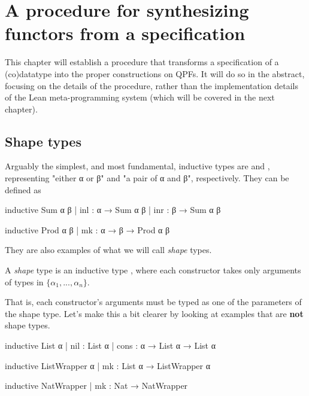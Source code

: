 
\chapter{A procedure for synthesizing functors from a specification}
\label{ch:procedure}

This chapter will establish a procedure that transforms a specification of a (co)datatype
into the proper constructions on QPFs.
It will do so in the abstract, focusing on the details of the procedure, rather than the implementation
details of the Lean meta-programming system (which will be covered in the next chapter).


\section{Shape types}
\label{sec:shape_types}

Arguably the simplest, and most fundamental, inductive types are  and ,
representing "either α or β" and "a pair of α and β", respectively.
They can be defined as

\begin{center}
\begin{minipage}[t]{0.45\linewidth}
    \begin{leancode}
inductive Sum α β
  | inl : α → Sum α β
  | inr : β → Sum α β
    \end{leancode}
\end{minipage}
\begin{minipage}[t]{0.45\linewidth}
    \begin{leancode}    
inductive Prod α β
  | mk : α → β → Prod α β
    \end{leancode}
\end{minipage}
\end{center}

They are also examples of what we will call \emph{shape} types.
\begin{definition}
    A \emph{shape} type is an inductive type , 
    where each constructor takes only arguments of types in $\{α_1, ..., α_n\}$.
\end{definition}
That is, each constructor's arguments must be typed as one of the parameters of the shape type.
Let's make this a bit clearer by looking at examples that are \textbf{not} shape types. 

\begin{leancode}
  inductive List α
    | nil  : List α 
    | cons : α → List α → List α

  inductive ListWrapper α
    | mk : List α → ListWrapper α

  inductive NatWrapper
    | mk : Nat → NatWrapper
\end{leancode}

